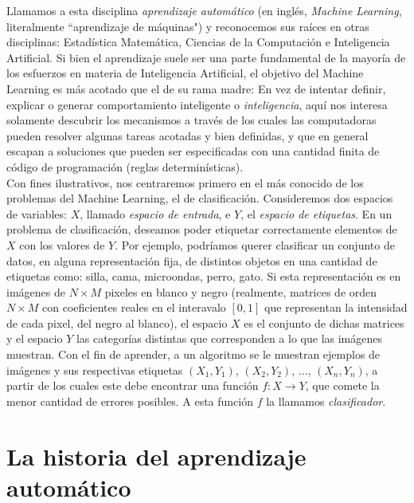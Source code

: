 \documentclass{article}
\begin{document}
Llamamos a esta disciplina \textit{aprendizaje automático} (en inglés, \textit{Machine Learning}, literalmente ``aprendizaje de máquinas") y reconocemos
sus raíces en otras disciplinas: Estadística Matemática, Ciencias de la Computación e Inteligencia Artificial. Si bien el aprendizaje suele ser una
parte fundamental de la mayoría de los esfuerzos en materia de Inteligencia Artificial, el objetivo del Machine Learning es más acotado que el de su 
rama madre: En vez de intentar definir, explicar o generar comportamiento inteligente o \textit{inteligencia}, aquí nos interesa solamente descubrir los mecanismos
a través de los cuales las computadoras pueden resolver algunas tareas acotadas y bien definidas, y que en general escapan a soluciones que pueden
ser especificadas con una cantidad finita de código de programación (reglas determinísticas). \\

Con fines ilustrativos, nos centraremos primero en el más conocido de los problemas del Machine Learning, el de clasificación. Consideremos dos espacios
de variables: \(X\), llamado \textit{espacio de entrada}, e \(Y\), el  \textit{espacio de etiquetas}. En un problema de clasificación, deseamos poder etiquetar
correctamente elementos de \(X\) con los valores de \(Y\). Por ejemplo, podríamos querer clasificar un conjunto de datos, en alguna representación fija, de distintos 
objetos en una cantidad de etiquetas como: silla, cama, microondas, perro, gato. Si esta representación es en imágenes de \(N\times M\) pixeles en blanco y negro (realmente, 
matrices de orden \(N\times M\) con coeficientes reales en el interavalo \([0,1]\) que representan la intensidad de cada pixel, del negro al blanco), el espacio \(X\) es 
el conjunto de dichas matrices y el espacio \(Y\) las categorías distintas que corresponden a lo que las imágenes muestran. Con el fin de aprender, a un algoritmo se le 
muestran ejemplos de imágenes y sus respectivas etiquetas \((X_1,Y_1)\), \((X_2,Y_2)\), ..., \((X_n,Y_n)\), a partir de los cuales este debe encontrar una función
\(f: X\rightarrow Y\), que comete la menor cantidad de errores posibles. A esta función \(f\) la llamamos \textit{clasificador}.

\section{La historia del aprendizaje automático}
\end{document}
